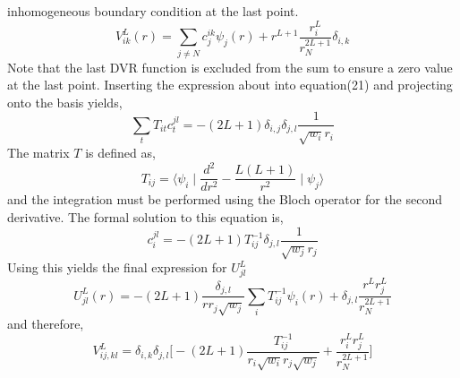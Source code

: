 \documentclass[preprint,showpacs,preprintnumbers,amsmath,amssymb]{revtex4}
\begin{document}
inhomogeneous boundary condition at the last point.  
\begin{equation}
 V^{L}_{ik}(r) = \sum_{j \neq N } c^{ik}_{j} \psi_{j}(r) 
                  +  r^{L+1} \frac {r^{L}_{i}}{r^{2L+1}_{N}} \delta_{i,k}
\end{equation}
Note that the last DVR function is excluded from the sum to ensure a 
zero value at the last point.
Inserting the expression about into equation(21) and projecting onto the 
basis yields,
\begin{equation}
 \sum_{t} T_{it} c^{jl}_{t}  = - (2L+1) \delta_{i,j} 
                            \delta_{j,l} \frac{1}{\sqrt{w_{i}} r_{i}}
\end{equation}
The matrix $T$ is defined as,
\begin{equation}
 T_{ij} = \langle \psi_{i} \mid \frac{d^2}{dr^2} - \frac{L(L+1)}{r^2}
           \mid \psi_{j} \rangle
\end{equation}
and the integration must be performed using the Bloch operator for the
second derivative.  The formal solution to this equation is,
\begin{equation}
 c^{jl}_{i}  = - (2L+1) T^{-1}_{ij} \delta_{j,l} 
                        \frac{1}{\sqrt{w_{j}} r_{j}}
\end{equation}
Using this yields the final expression for $U^{L}_{jl}$
\begin{equation}
 U^{L}_{jl}(r) = -(2L+1) \frac{ \delta_{j,l} }{r r_{j} \sqrt{w_{j}} }
               \sum_{i} T^{-1}_{ij} \psi_{i}(r)  
               + \delta_{j,l} \frac{ r^{L} r^{L}_{j} }{r^{2L+1}_{N}}
\end{equation}
and therefore,
\begin{equation}
  V^{L}_{ij,kl} = \delta_{i,k} \delta_{j,l} \big [ 
                    -(2L+1) \frac{ T^{-1}_{ij} }{ r_{i} \sqrt{w_{i}}
                                                  r_{j} \sqrt{w_{j}} }
                    + \frac{ r^{L}_{i} r^{L}_{j } } { r^{2L+1}_{N} }
                    \big ]
\end{equation}
\end{document}
